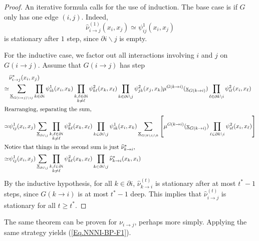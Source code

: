 \documentclass[12pt]{article}
\newcommand{\BS}{\backslash}
\newcommand{\wh}[1]{\widehat{#1}}
\newcommand{\UBX}{\underbar{\textbf{\normalfont x}}}
\newcommand{\PI}{{\partial i}}
\newcommand{\RA}{\rightarrow}
\numberwithin{equation}{section}
\begin{document}
\begin{proof}
    An iterative formula calls for the use of induction. The base case is if $G$ only has one edge $(i, j)$. Indeed,
    \begin{equation*}
        \wh{\nu}^{(1)}_{i\RA j}(x_i, x_j) \simeq \psi^1_{ij}(x_i, x_j)
    \end{equation*}
    is stationary after $1$ step, since $\PI\BS j$ is empty.

    For the inductive case, we factor out all interactions involving $i$ and $j$ on $G(i\RA j)$. Assume that $G(i\RA j)$ has step
    \begin{align*}
               & \wh{\nu}^*_{i\RA j}(x_i, x_j)                                                                  \\
        \simeq & \sum_{\UBX_{G(i\RA j)\BS ij}}\prod_{k\in\PI}\psi^1_{ik}(x_i, x_k)\prod_{\substack{k,\ell\in\PI \\k\neq\ell}}\psi^2_{k\ell}(x_k, x_\ell)\prod_{k\in\PI\BS j}\psi^2_{jk}(x_j, x_k)\mu^{G(k\RA i)}(\UBX_{G(k\RA i)})\prod_{\ell\in\partial k\BS i}\psi^2_{i\ell}(x_i, x_\ell)                     \\
        \intertext{Rearranging, separating the sum, }
        \simeq & \psi^1_{ij}(x_i, x_j)\sum_{\UBX_{\PI\BS j}}\prod_{\substack{k,\ell\in\PI                       \\k\neq\ell}}\psi^2_{k\ell}(x_k, x_\ell)\prod_{k\in\PI\BS j}\psi^1_{ik}(x_i, x_k)\sum_{\UBX_{G(k\BS i)\BS k}}\left[\mu^{G(k\RA i)}(\UBX_{G(k\RA i)})\prod_{\ell\in\partial k\BS i}\psi^2_{i\ell}(x_i, x_\ell) \right] \\
        \intertext{Notice that things in the second sum is just $\wh{\nu}^*_{k\RA i}$,}
        \simeq & \psi^1_{ij}(x_i, x_j)\sum_{\UBX_{\PI\BS j}}\prod_{\substack{k,\ell\in\PI                       \\k\neq\ell}}\psi^2_{k\ell}(x_k, x_\ell)\prod_{k\in\PI\BS j}\wh{\nu}^*_{k\RA i}(x_k, x_i)
    \end{align*}
    By the inductive hypothesis, for all $k\in\PI$, $\wh{\nu}^{(t)}_{k\RA i}$ is stationary after at most $t^*-1$ steps, since $G(k\RA i)$ is at most
    $t^*-1$ deep. This implies that $\wh{\nu}^{(t)}_{i\RA j}$ is stationary for all $t\geq t^*$.
\end{proof}

The same theorem can be proven for $\nu_{i\RA j}$, perhaps more simply. Applying the same strategy yields (\ref{Eq.NNNI-BP-F1}).

\newpage
\end{document}
